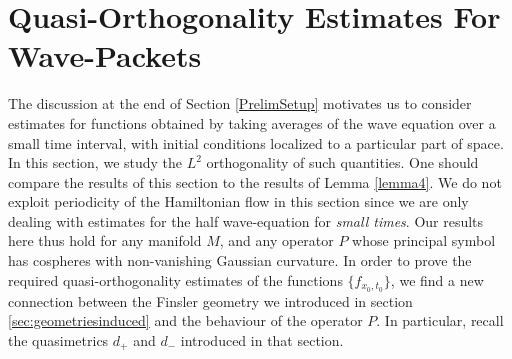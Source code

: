 \section{Quasi-Orthogonality Estimates For Wave-Packets} \label{estimatesforwavepackets}

The discussion at the end of Section \ref{PrelimSetup} motivates us to consider estimates for functions obtained by taking averages of the wave equation over a small time interval, with initial conditions localized to a particular part of space. In this section, we study the $L^2$ orthogonality of such quantities. One should compare the results of this section to the results of Lemma \ref{lemma4}. We do not exploit periodicity of the Hamiltonian flow in this section since we are only dealing with estimates for the half wave-equation for \emph{small times}. Our results here thus hold for any manifold $M$, and any operator $P$ whose principal symbol has cospheres with non-vanishing Gaussian curvature. In order to prove the required quasi-orthogonality estimates of the functions $\{ f_{x_0,t_0} \}$, we find a new connection between the Finsler geometry we introduced in section \ref{sec:geometriesinduced} and the behaviour of the operator $P$. In particular, recall the quasimetrics $d_+$ and $d_-$ introduced in that section.

